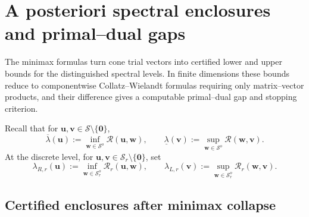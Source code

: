 \documentclass[preprint,10pt]{elsarticle}
\theoremstyle{plain}
\theoremstyle{definition}
\theoremstyle{remark}
\begin{document}
\section{A posteriori spectral enclosures and primal--dual gaps}
\label{sec:aposteriori-enclosures}

The minimax formulas turn cone trial vectors into certified lower and
upper bounds for the distinguished spectral levels. In finite dimensions
these bounds reduce to componentwise Collatz--Wielandt formulas requiring
only matrix--vector products, and their difference gives a computable
primal--dual gap and stopping criterion.

Recall that for $\mathbf{u},\mathbf{v}\in\mathcal{S}\setminus\{\mathbf{0}\}$,
\[
\overline\lambda(\mathbf{u})
:= \inf_{\mathbf{w}\in\mathcal{S}^o}\mathcal{R}(\mathbf{u},\mathbf{w}),
\qquad
\underline\lambda(\mathbf{v})
:= \sup_{\mathbf{w}\in\mathcal{S}^o}\mathcal{R}(\mathbf{w},\mathbf{v}).
\]
At the discrete level, for
$\mathbf{u},\mathbf{v}\in\mathcal{S}_r\setminus\{\mathbf{0}\}$, set
\begin{equation}\label{eq:discrete-trial-values}
	\lambda_{R,r}(\mathbf{u})
	:= \inf_{\mathbf{w}\in\mathcal{S}_r^o}\mathcal{R}_r(\mathbf{u},\mathbf{w}),
	\qquad
	\lambda_{L,r}(\mathbf{v})
	:= \sup_{\mathbf{w}\in\mathcal{S}_r^o}\mathcal{R}_r(\mathbf{w},\mathbf{v}).
\end{equation}

\subsection{Certified enclosures after minimax collapse}
\end{document}
